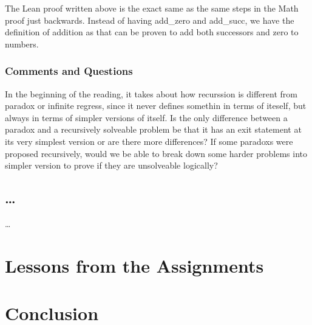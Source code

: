 \documentclass{article}
\theoremstyle{theorem}
\theoremstyle{definition}
\theoremstyle{remark}
\begin{document}
The Lean proof written above is the exact same as the same steps in the Math proof just backwards. 
Instead of having add\_zero and add\_succ, we have the definition of addition as that can be proven to add both 
successors and zero to numbers.  

\subsubsection*{Comments and Questions}

In the beginning of the reading, it takes about how recurssion is different from paradox or infinite regress, since it  never defines somethin in terms of iteself, but always in terms of simpler versions of itself. Is the only difference between a paradox and a recursively solveable problem be that it has an exit statement at its very simplest version or are there more differences? If some paradoxs were proposed recursively, would we be able to break down some harder problems into simpler version to prove if they are unsolveable logically?

\subsection{\ldots}

\ldots

\section{Lessons from the Assignments}





\section{Conclusion}\label{conclusion}
\end{document}

